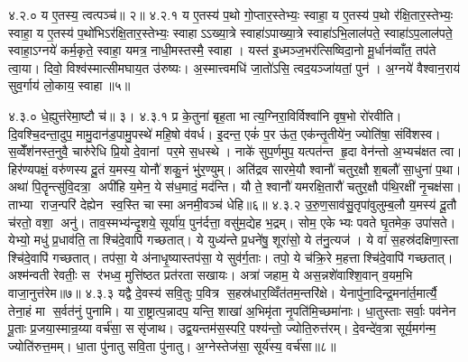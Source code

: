 ४.२.०
य ए॒तस्य॒ त्वत्पञ्च॑॥ २॥
४.२.१
य ए॒तस्य॑ प॒थो गो॒प्तार॒स्तेभ्यः॒ स्वाहा॒ य ए॒तस्य॑ प॒थो र॑क्षि॒तार॒स्तेभ्यः॒ स्वाहा॒ य ए॒तस्य॑ प॒थो॑भिऽर॑क्षि॒तार॒स्तेभ्यः॒ स्वाहाऽऽख्या॒त्रे स्वाहा॑ऽपाख्या॒त्रे स्वाहा॑ऽभि॒लाल॑पते॒ स्वाहा॑ऽप॒लाल॑पते॒ स्वाहा॒ऽग्नये॑ कर्म॒कृते॒ स्वाहा॒ यमत्र॒ नाधी॒मस्तस्मै॒ स्वाहा। यस्त॑ इ॒ध्मञ्ज॒भर॑त्सिष्विदा॒नो मू॒र्धान॑व्वाँत॒ तप॑ते त्वा॒या। दिवो॒ विश्व॑स्मात्सीमघाय॒त उ॑रुष्यः। अ॒स्मात्त्वमधि॑ जा॒तो॑ऽसि॒ त्वद॒यञ्जा॑यतां॒ पुन॑। अ॒ग्नये॑ वैश्वान॒राय॑ सुव॒र्गाय॑ लो॒काय॒ स्वाहा॥५॥
\anuvakamend

४.३.०
धे॒ह्युत्त॑रेमा॒ष्टौ च॑॥ ३।
४.३.१
प्र के॒तुना॑ बृह॒ता भात्य॒ग्निरा॒विर्विश्वा॑नि वृष॒भो रो॑रवीति। दि॒वश्चि॒दन्ता॒दुप॒ मामु॒दान॑ड॒पामु॒पस्थे॑ महि॒षो व॑वर्ध। इ॒दन्त॒ एकं॑ प॒र ऊ॑त॒ एक॑न्तृ॒तीये॑न॒ ज्योति॑षा॒ संवि॑शस्व। स॒व्वेँश॑नस्त॒नुवै॒ चारु॑रेधि प्रि॒यो दे॒वानां पर॒मे स॒धस्थे। नाके॑ सुप॒र्णमुप॒ यत्पत॑न्त हृ॒दा वेन॑न्तो अ॒भ्यच॑क्षत त्वा। हिर॑ण्यपक्षं॒ वरु॑णस्य दू॒तं य॒मस्य॒ योनौ॑ शकु॒नं भु॑र॒ण्युम्। अति॑द्रव सारमे॒यौ श्वानौ॑ चतुर॒क्षौ श॒बलौ॑ सा॒धुना॑ प॒था। अथा॑ पि॒तॄन्त्सु॑वि॒दत्रा॒ अपी॑हि य॒मेन॒ ये स॑ध॒मादं॒ मद॑न्ति। यौ ते॒ श्वानौ॑ यमरक्षि॒तारौ॑ चतुर॒क्षौ प॑थि॒रक्षी॑ नृ॒चक्ष॑सा। ताभ्या राज॒न्परि॑ देह्येन स्व॒स्ति चास्मा अनमी॒वञ्च॑ धेहि॥६॥
४.३.२
उ॒रु॒ण॒साव॑सु॒तृपा॑वुलुम्ब॒लौ य॒मस्य॑ दू॒तौ च॑रतो॒ वशा॒ अनु॑। ताव॒स्मभ्य॑न्दृ॒शये॒ सूर्या॑य॒ पुन॑र्दत्ता॒ वसु॑म॒द्येह भ॒द्रम्। सोम॒ एकेभ्यः पवते घृ॒तमेक॒ उपा॑सते। येभ्यो॒ मधु॑ प्र॒धाव॑ति॒ ताश्चि॑दे॒वापि॑ गच्छतात्। ये युध्य॑न्ते प्र॒धने॑षु॒ शूरा॑सो॒ ये त॑नु॒त्यज॑। ये वा॑ स॒हस्र॑दक्षिणा॒स्ता श्चि॑दे॒वापि॑ गच्छतात्। तप॑सा॒ ये अ॑नाधृ॒ष्यास्तप॑सा॒ ये सुव॑र्ग॒ताः। तपो॒ ये च॑क्रि॒रे म॒हत्ताश्चि॑दे॒वापि॑ गच्छतात्। अश्म॑न्वती रेवतीः॒ स र॑भध्व॒ मुत्ति॑ष्ठत प्रत॑रता सखायः। अत्रा॑ जहाम॒ ये अस॒न्नशे॑वाश्शि॒वान् व॒यम॒भि वाजा॒नुत्त॑रेम॥७॥
४.३.३
यद्वै दे॒वस्य॑ सवि॒तुः प॒वित्र स॒हस्र॑धार॒व्विँत॑तम॒न्तरि॑क्षे। येनापु॑ना॒दिन्द्र॒मना॑र्त॒मार्त्यै॒ तेना॒हं मा स॒र्वत॑नुं पुनामि। या रा॒ष्ट्रात्प॒न्नादप॒ यन्ति॒ शाखा॑ अ॒भिमृ॑ता नृ॒पति॑मि॒च्छमा॑नाः। धा॒तुस्ताः सर्वाः॒ पव॑नेन पू॒ताः प्र॒जया॒स्मान्र॒य्या वर्च॑सा॒ ससृ॑जाथ। उद्व॒यन्तम॑स॒स्परि॒ पश्य॑न्तो॒ ज्योति॒रुत्त॑रम्। दे॒वन्दे॑व॒त्रा सूर्य॒मग॑न्म॒ ज्योति॑रुत्त॒मम्। धा॒ता पु॑नातु सवि॒ता पु॑नातु। अ॒ग्नेस्तेज॑सा॒ सूर्य॑स्य॒ वर्च॑सा॥८॥
\anuvakamend

